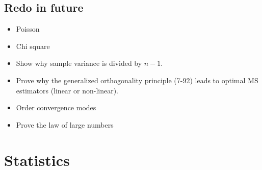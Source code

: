 \documentclass[a4paper, oneside]{book}
\begin{document}
\section{Redo in future}
\begin{itemize}
\item Poisson
\item Chi square 
\item Show why sample variance is divided by $n-1$.
\item Prove why the generalized orthogonality principle (7-92) leads to optimal MS estimators (linear or non-linear).
\item Order convergence modes
\item Prove the law of large numbers
\end{itemize}









\chapter{Statistics}
\end{document}
